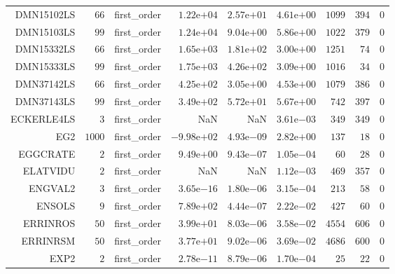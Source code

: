 \begin{longtable}{rrrrrrrrr}
DMN15102LS & \(    66\) & first\_order & \( 1.22\)e\(+04\) & \( 2.57\)e\(+01\) & \( 4.61\)e\(+00\) & \(  1099\) & \(   394\) & \(     0\) \\
DMN15103LS & \(    99\) & first\_order & \( 1.24\)e\(+04\) & \( 9.04\)e\(+00\) & \( 5.86\)e\(+00\) & \(  1022\) & \(   379\) & \(     0\) \\
DMN15332LS & \(    66\) & first\_order & \( 1.65\)e\(+03\) & \( 1.81\)e\(+02\) & \( 3.00\)e\(+00\) & \(  1251\) & \(    74\) & \(     0\) \\
DMN15333LS & \(    99\) & first\_order & \( 1.75\)e\(+03\) & \( 4.26\)e\(+02\) & \( 3.09\)e\(+00\) & \(  1016\) & \(    34\) & \(     0\) \\
DMN37142LS & \(    66\) & first\_order & \( 4.25\)e\(+02\) & \( 3.05\)e\(+00\) & \( 4.53\)e\(+00\) & \(  1079\) & \(   386\) & \(     0\) \\
DMN37143LS & \(    99\) & first\_order & \( 3.49\)e\(+02\) & \( 5.72\)e\(+01\) & \( 5.67\)e\(+00\) & \(   742\) & \(   397\) & \(     0\) \\
ECKERLE4LS & \(     3\) & first\_order &       NaN &       NaN & \( 3.61\)e\(-03\) & \(   349\) & \(   349\) & \(     0\) \\
EG2 & \(  1000\) & first\_order & \(-9.98\)e\(+02\) & \( 4.93\)e\(-09\) & \( 2.82\)e\(+00\) & \(   137\) & \(    18\) & \(     0\) \\
EGGCRATE & \(     2\) & first\_order & \( 9.49\)e\(+00\) & \( 9.43\)e\(-07\) & \( 1.05\)e\(-04\) & \(    60\) & \(    28\) & \(     0\) \\
ELATVIDU & \(     2\) & first\_order &       NaN &       NaN & \( 1.12\)e\(-03\) & \(   469\) & \(   357\) & \(     0\) \\
ENGVAL2 & \(     3\) & first\_order & \( 3.65\)e\(-16\) & \( 1.80\)e\(-06\) & \( 3.15\)e\(-04\) & \(   213\) & \(    58\) & \(     0\) \\
ENSOLS & \(     9\) & first\_order & \( 7.89\)e\(+02\) & \( 4.44\)e\(-07\) & \( 2.22\)e\(-02\) & \(   427\) & \(    60\) & \(     0\) \\
ERRINROS & \(    50\) & first\_order & \( 3.99\)e\(+01\) & \( 8.03\)e\(-06\) & \( 3.58\)e\(-02\) & \(  4554\) & \(   606\) & \(     0\) \\
ERRINRSM & \(    50\) & first\_order & \( 3.77\)e\(+01\) & \( 9.02\)e\(-06\) & \( 3.69\)e\(-02\) & \(  4686\) & \(   600\) & \(     0\) \\
EXP2 & \(     2\) & first\_order & \( 2.78\)e\(-11\) & \( 8.79\)e\(-06\) & \( 1.70\)e\(-04\) & \(    25\) & \(    22\) & \(     0\) \\

\end{longtable}

